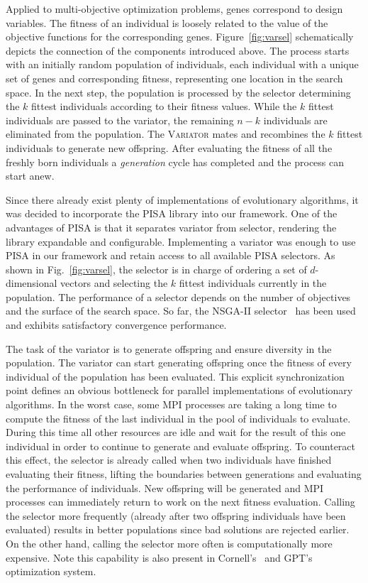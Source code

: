 \documentclass[preprint,linenumbers,amsmath,amssymb,aps,prstab]{revtex4-1}%
\begin{document}
Applied to multi-objective optimization problems, genes correspond to
  design variables.
The fitness of an individual is loosely related to the value of the objective
  functions for the corresponding genes.
Figure~\ref{fig:varsel} schematically depicts the connection of the
  components introduced above.
The process starts with an initially random population of individuals, each
  individual with a unique set of genes and corresponding fitness,
  representing one location in the search space.
In the next step, the population is processed by the selector
  determining the $k$ fittest individuals according to their fitness values.
While the $k$ fittest individuals are passed to the variator, the
  remaining $n-k$ individuals are eliminated from the population.
The \textsc{Variator} mates and recombines the $k$ fittest individuals to
  generate new offspring.
After evaluating the fitness of all the freshly born individuals a
  \textit{generation} cycle has completed and the process can start anew.

Since there already exist plenty of implementations of evolutionary algorithms,
  it was decided to incorporate the PISA library \cite{pisa} into our
  framework.
One of the advantages of PISA is that it separates variator from selector,
  rendering the library expandable and configurable.
Implementing a variator was enough to use PISA in our framework and
  retain access to all available PISA selectors.
As shown in Fig.~\ref{fig:varsel}, the selector is in charge of ordering a
  set of $d$-dimensional vectors and selecting the $k$ fittest individuals
  currently in the population.
The performance of a selector depends on the number of objectives and the
  surface of the search space.
So far, the NSGA-II selector~\cite{dpam:02} has been used and exhibits satisfactory
  convergence performance.

The task of the variator is to generate offspring and ensure diversity in the
  population.
The variator can start generating offspring once the fitness of every
  individual of the population has been evaluated.
This explicit synchronization point defines an obvious bottleneck for parallel
  implementations of evolutionary algorithms.
In the worst case, some MPI processes are taking a long time to compute the
  fitness of the last individual in the pool of individuals to evaluate.
During this time all other resources are idle and wait for the result of
  this one individual in order to continue to generate and evaluate offspring.
To counteract this effect, the selector is already called when two individuals
  have finished evaluating their fitness, lifting the boundaries between
  generations and evaluating the performance of individuals.
New offspring will be generated and MPI processes can immediately return to
  work on the next fitness evaluation.
Calling the selector more frequently (already after two offspring
  individuals have been evaluated) results in better populations since bad
  solutions are rejected earlier.
On the other hand, calling the selector more often is computationally more
  expensive. Note this capability is also present in Cornell's~\cite{bazarov05} 
  and GPT's~\cite{gpt} optimization system. 
\end{document}
